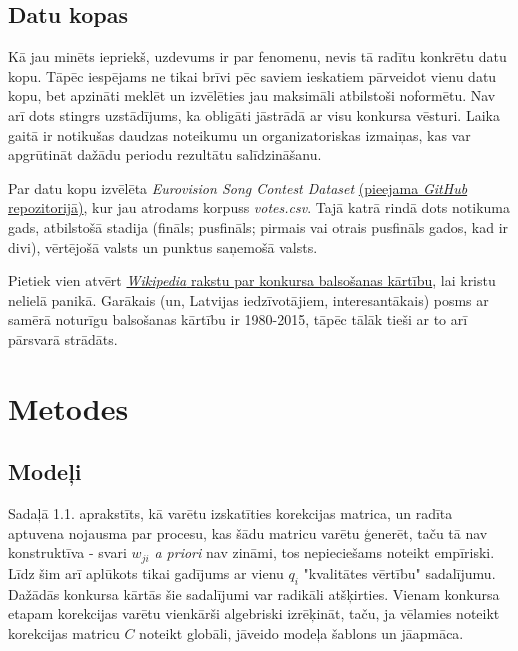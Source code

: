 \documentclass[12pt, a4paper]{article}
\begin{document}
\subsection{Datu kopas}

Kā jau minēts iepriekš, uzdevums ir par fenomenu, nevis tā radītu konkrētu datu kopu. Tāpēc iespējams ne tikai brīvi pēc saviem ieskatiem pārveidot vienu datu kopu, bet apzināti meklēt un izvēlēties jau maksimāli atbilstoši noformētu. Nav arī dots stingrs uzstādījums, ka obligāti jāstrādā ar visu konkursa vēsturi. Laika gaitā ir notikušas daudzas noteikumu un organizatoriskas izmaiņas, kas var apgrūtināt dažādu periodu rezultātu salīdzināšanu.

Par datu kopu izvēlēta \textit{Eurovision Song Contest Dataset} \href{https://github.com/Spijkervet/eurovision-dataset}{(pieejama \textit{GitHub} repozitorijā)}, kur jau atrodams korpuss \textit{votes.csv}. Tajā katrā rindā dots notikuma gads, atbilstošā stadija (fināls; pusfināls; pirmais vai otrais pusfināls gados, kad ir divi), vērtējošā valsts un punktus saņemošā valsts. 

Pietiek vien atvērt \href{https://en.wikipedia.org/wiki/Voting_at_the_Eurovision_Song_Contest}{\textit{Wikipedia} rakstu par konkursa balsošanas kārtību}, lai kristu nelielā panikā. Garākais (un, Latvijas iedzīvotājiem, interesantākais) posms ar samērā noturīgu balsošanas kārtību ir 1980-2015, tāpēc tālāk tieši ar to arī pārsvarā strādāts.

\newpage
\section{Metodes}

\subsection{Modeļi}

Sadaļā 1.1. aprakstīts, kā varētu izskatīties korekcijas matrica, un radīta aptuvena nojausma par procesu, kas šādu matricu varētu ģenerēt, taču tā nav konstruktīva - svari $w_{ji}$ \textit{a priori} nav zināmi, tos nepieciešams noteikt empīriski. Līdz šim arī aplūkots tikai gadījums ar vienu $q_i$ "kvalitātes vērtību" sadalījumu. Dažādās konkursa kārtās šie sadalījumi var radikāli atšķirties. Vienam konkursa etapam korekcijas varētu vienkārši algebriski izrēķināt, taču, ja vēlamies noteikt korekcijas matricu $C$ noteikt globāli, jāveido modeļa šablons un jāapmāca.
\end{document}
